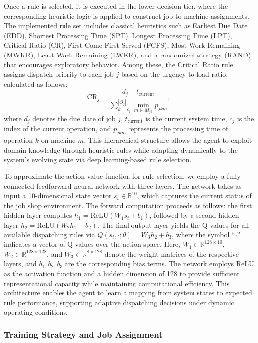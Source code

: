 \documentclass{article}
\begin{document}
Once a rule is selected, it is executed in the lower decision tier, where the corresponding heuristic logic is applied to construct job-to-machine assignments. The implemented rule set includes classical heuristics such as Earliest Due Date (EDD), Shortest Processing Time (SPT), Longest Processing Time (LPT), Critical Ratio (CR), First Come First Served (FCFS), Most Work Remaining (MWKR), Least Work Remaining (LWKR), and a randomized strategy (RAND) that encourages exploratory behavior. Among these, the Critical Ratio rule assigns dispatch priority to each job \( j \) based on the urgency-to-load ratio, calculated as follows:
\[
\mathrm{CR}_j = \frac{d_j - t_{\text{current}}}{\sum_{k=c_j}^{|O_j|} \min_{m \in M_{jk}} p_{jkm}},
\]
where \( d_j \) denotes the due date of job \( j \), \( t_{\text{current}} \) is the current system time, \( c_j \) is the index of the current operation, and \( p_{jkm} \) represents the processing time of operation \( k \) on machine \( m \). This hierarchical structure allows the agent to exploit domain knowledge through heuristic rules while adapting dynamically to the system’s evolving state via deep learning-based rule selection.


To approximate the action-value function for rule selection, we employ a fully connected feedforward neural network with three layers. The network takes as input a 10-dimensional state vector \( s_t \in \mathbb{R}^{10} \), which captures the current status of the job shop environment. The forward computation proceeds as follows: the first hidden layer computes \( h_1 = \mathrm{ReLU}(W_1 s_t + b_1) \), followed by a second hidden layer \( h_2 = \mathrm{ReLU}(W_2 h_1 + b_2) \). The final output layer yields the Q-values for all available dispatching rules via \( Q(s_t, \cdot; \theta) = W_3 h_2 + b_3 \), where the symbol ``\(\cdot\)'' indicates a vector of Q-values over the action space. Here, \( W_1 \in \mathbb{R}^{128 \times 10} \), \( W_2 \in \mathbb{R}^{128 \times 128} \), and \( W_3 \in \mathbb{R}^{8 \times 128} \) denote the weight matrices of the respective layers, and \( b_1, b_2, b_3 \) are the corresponding bias terms. The network employs ReLU as the activation function and a hidden dimension of 128 to provide sufficient representational capacity while maintaining computational efficiency. This architecture enables the agent to learn a mapping from system states to expected rule performance, supporting adaptive dispatching decisions under dynamic operating conditions.

\subsubsection{Training Strategy and Job Assignment}
\end{document}
